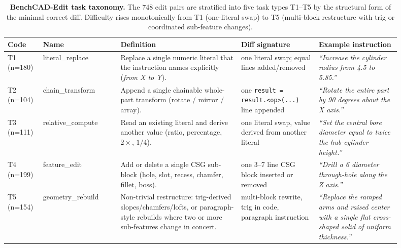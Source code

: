 \begin{table}[t]
    \centering
    \caption{\textbf{BenchCAD-Edit task taxonomy.} The 748 edit pairs are stratified into five task types T1--T5 by the structural form of the minimal correct diff. Difficulty rises monotonically from T1 (one-literal swap) to T5 (multi-block restructure with trig or coordinated sub-feature changes).}
    \label{tab:task_taxonomy}
    \small
    \begin{tabular}{@{}p{0.07\linewidth}p{0.18\linewidth}p{0.28\linewidth}p{0.18\linewidth}p{0.19\linewidth}@{}}
    \toprule
    \textbf{Code} & \textbf{Name} & \textbf{Definition} & \textbf{Diff signature} & \textbf{Example instruction} \\
    \midrule
    T1 \mbox{(n=180)} & literal\_\allowbreak replace & Replace a single numeric literal that the instruction names explicitly (\emph{from X to Y}). & one literal swap; equal lines added/removed & \emph{``Increase the cylinder radius from 4.5 to 5.85.''} \\
    T2 \mbox{(n=104)} & chain\_\allowbreak transform & Append a single chainable whole-part transform (rotate / mirror / array). & one \texttt{result = result.<op>(...)} line appended & \emph{``Rotate the entire part by 90 degrees about the X axis.''} \\
    T3 \mbox{(n=111)} & relative\_\allowbreak compute & Read an existing literal and derive another value (ratio, percentage, $2\times$, $1/4$). & one literal swap, value derived from another literal & \emph{``Set the central bore diameter equal to twice the hub-cylinder height.''} \\
    T4 \mbox{(n=199)} & feature\_\allowbreak edit & Add or delete a single CSG sub-block (hole, slot, recess, chamfer, fillet, boss). & one 3--7 line CSG block inserted or removed & \emph{``Drill a 6 diameter through-hole along the Z axis.''} \\
    T5 \mbox{(n=154)} & geometry\_\allowbreak rebuild & Non-trivial restructure: trig-derived slopes/chamfers/lofts, or paragraph-style rebuilds where two or more sub-features change in concert. & multi-block rewrite, trig in code, paragraph instruction & \emph{``Replace the ramped arms and raised center with a single flat cross-shaped solid of uniform thickness.''} \\
    \bottomrule
    \end{tabular}
    \end{table}
    